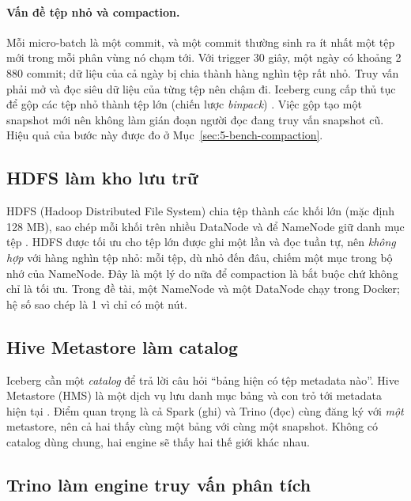 \paragraph{Vấn đề tệp nhỏ và compaction.} Mỗi micro-batch là một commit, và một commit thường sinh ra ít nhất một tệp mới trong mỗi phân vùng nó chạm tới. Với trigger 30 giây, một ngày có khoảng 2\,880 commit; dữ liệu của cả ngày bị chia thành hàng nghìn tệp rất nhỏ. Truy vấn phải mở và đọc siêu dữ liệu của từng tệp nên chậm đi. Iceberg cung cấp thủ tục  để gộp các tệp nhỏ thành tệp lớn (chiến lược \emph{binpack}) \cite{iceberg_procedures}. Việc gộp tạo một snapshot mới nên không làm gián đoạn người đọc đang truy vấn snapshot cũ. Hiệu quả của bước này được đo ở Mục~\ref{sec:5-bench-compaction}.

\subsection{HDFS làm kho lưu trữ}
\label{sec:2-hdfs}

HDFS (Hadoop Distributed File System) chia tệp thành các khối lớn (mặc định 128 MB), sao chép mỗi khối trên nhiều DataNode và để NameNode giữ danh mục tệp \cite{hdfs_design}. HDFS được tối ưu cho tệp lớn được ghi một lần và đọc tuần tự, nên \emph{không hợp} với hàng nghìn tệp nhỏ: mỗi tệp, dù nhỏ đến đâu, chiếm một mục trong bộ nhớ của NameNode. Đây là một lý do nữa để compaction là bắt buộc chứ không chỉ là tối ưu. Trong đề tài, một NameNode và một DataNode chạy trong Docker; hệ số sao chép là 1 vì chỉ có một nút.

\subsection{Hive Metastore làm catalog}
\label{sec:2-hms}

Iceberg cần một \emph{catalog} để trả lời câu hỏi ``bảng  hiện có tệp metadata nào''. Hive Metastore (HMS) là một dịch vụ lưu danh mục bảng và con trỏ tới metadata hiện tại \cite{hive_metastore}. Điểm quan trọng là cả Spark (ghi) và Trino (đọc) cùng đăng ký với \emph{một} metastore, nên cả hai thấy cùng một bảng với cùng một snapshot. Không có catalog dùng chung, hai engine sẽ thấy hai thế giới khác nhau.

\subsection{Trino làm engine truy vấn phân tích}
\label{sec:2-trino}

